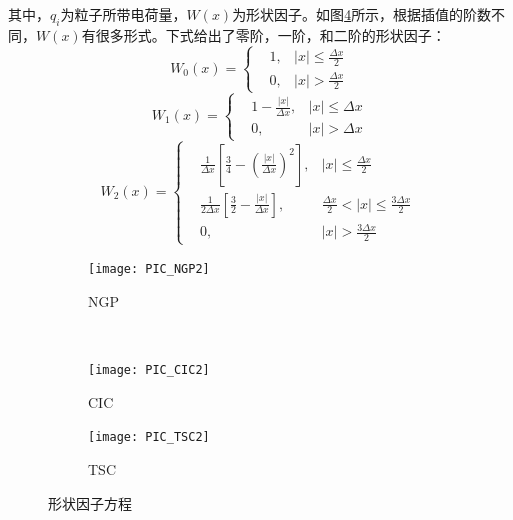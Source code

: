 {其中，$q_i$为粒子所带电荷量，$W(x)$为形状因子。如图\ref{fig:PIC_weighting2}所示，根据插值的阶数不同，$W(x)$有很多形式。下式给出了零阶，一阶，和二阶的形状因子：
\begin{equation}\label{eq:NGP}
  W_0(x)=\left\{
  \begin{aligned}
  &1, &\left| x \right| \leqslant \frac{\Delta x}{2} \\
  &0, &\left| x \right| >         \frac{\Delta x}{2}
  \end{aligned}
  \right.
\end{equation}
\begin{equation}\label{eq:CIC}
  W_1(x)=\left\{
  \begin{aligned}
  &1-\frac{\left| x \right|}{\Delta x}, &\left| x \right| \leqslant \Delta x \\
  &0                                  , &\left| x \right| >         \Delta x
  \end{aligned}
  \right.
\end{equation}
\begin{equation}\label{eq:TSC}
  W_2(x)=\left\{
  \begin{aligned}
  &\frac{1}{ \Delta x} \left[\frac{3}{4}-(\frac{\left| x \right|}{\Delta x})^2 \right], &\left| x \right| \leqslant \frac{\Delta x}{2} \qquad \quad \\
  &\frac{1}{2\Delta x} \left[\frac{3}{2}- \frac{\left| x \right|}{\Delta x}    \right], &\frac{\Delta x}{2} < \left| x \right| \leqslant \frac{3\Delta x}{2} \\
  &0,                                                                                   &\left| x \right| > \frac{3\Delta x}{2}\qquad \ \
  \end{aligned}
  \right.
\end{equation}


\begin{figure}[!htbp]
  \centering
  \begin{subfigure}[b]{0.8\textwidth}
    \texttt{[image: PIC\_NGP2]}
    \caption{NGP}
    \label{fig:PIC_NGP2}
  \end{subfigure}%
  ~%
  \begin{subfigure}[b]{0.8\textwidth}
    \texttt{[image: PIC\_CIC2]}
    \caption{CIC}
    \label{fig:PIC_CIC2}
  \end{subfigure}
  \begin{subfigure}[b]{0.8\textwidth}
    \texttt{[image: PIC\_TSC2]}
    \caption{TSC}
    \label{fig:PIC_TSC2}
  \end{subfigure}%
  \caption{形状因子方程}
  \label{fig:PIC_weighting2}
\end{figure}

}
